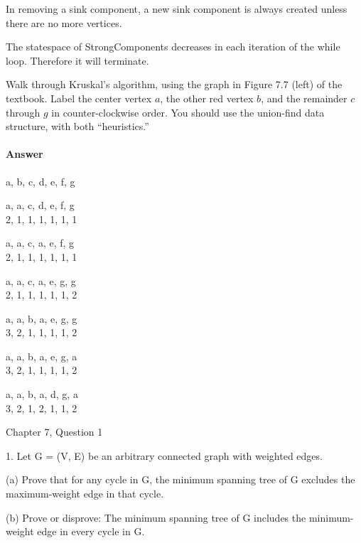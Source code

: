 \documentclass{article}
\begin{document}
In removing a sink component, a new sink component is always created unless there
are no more vertices.

The statespace of StrongComponents decreases in each iteration of the while loop.
Therefore it will terminate.

\collab{}

Walk through Kruskal's algorithm, using the graph in Figure 7.7 (left) of the
textbook.  Label the center vertex $a$, the other red vertex $b$, and the
remainder $c$ through $g$ in counter-clockwise order.  You should use the
union-find data structure, with both ``heuristics.''

\paragraph{Answer}

a, b, c, d, e, f, g

a, a, c, d, e, f, g\\
2, 1, 1, 1, 1, 1, 1

a, a, c, a, e, f, g\\
2, 1, 1, 1, 1, 1, 1

a, a, c, a, e, g, g\\
2, 1, 1, 1, 1, 1, 2

a, a, b, a, e, g, g\\
3, 2, 1, 1, 1, 1, 2

a, a, b, a, e, g, a\\
3, 2, 1, 1, 1, 1, 2

a, a, b, a, d, g, a\\
3, 2, 1, 2, 1, 1, 2



\collab{}

Chapter 7, Question 1

1. Let G = (V, E) be an arbitrary connected graph with weighted edges.

(a) Prove that for any cycle in G, the minimum spanning tree of G excludes
the maximum-weight edge in that cycle.

(b) Prove or disprove: The minimum spanning tree of G includes the
minimum-weight edge in every cycle in G.
\end{document}
